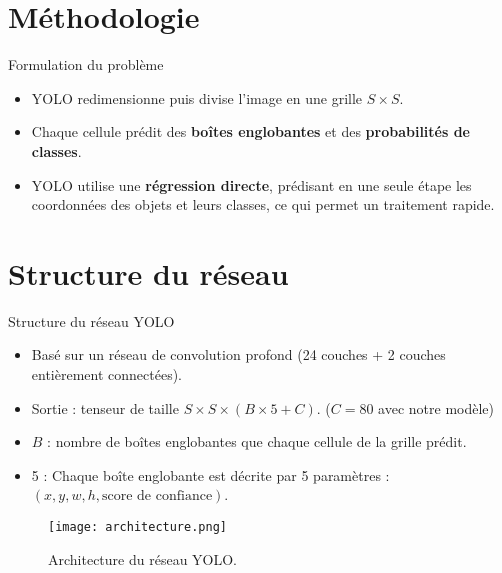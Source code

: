 \documentclass{beamer}
\begin{document}

\section{Méthodologie}
\begin{frame}{Formulation du problème}
    \begin{itemize}
        \item YOLO redimensionne puis divise l'image en une grille $S \times S$.\pause
        \item Chaque cellule prédit des \textbf{boîtes englobantes} et des \textbf{probabilités de classes}.\pause
        \item YOLO utilise une \textbf{régression directe}, prédisant en une seule étape les coordonnées des objets et leurs classes, ce qui permet un traitement rapide.
    \end{itemize}
\end{frame}

\section{Structure du réseau}
\begin{frame}{Structure du réseau YOLO}
    \begin{itemize}
        \item Basé sur un réseau de convolution profond (24 couches + 2 couches entièrement connectées).\pause
        \item Sortie : tenseur de taille \(S \times S \times (B \times 5 + C)\). (\(C = 80\) avec notre modèle)\pause
        \item \(B\) : nombre de boîtes englobantes que chaque cellule de la grille prédit.\pause
        \item 5 : Chaque boîte englobante est décrite par 5 paramètres : \((x, y, w, h, \text{score de confiance})\).\pause
    \end{itemize}
    \begin{figure}
        \centering
        \texttt{[image: architecture.png]}
        \caption{Architecture du réseau YOLO.}
    \end{figure}
\end{frame}

\end{document}
